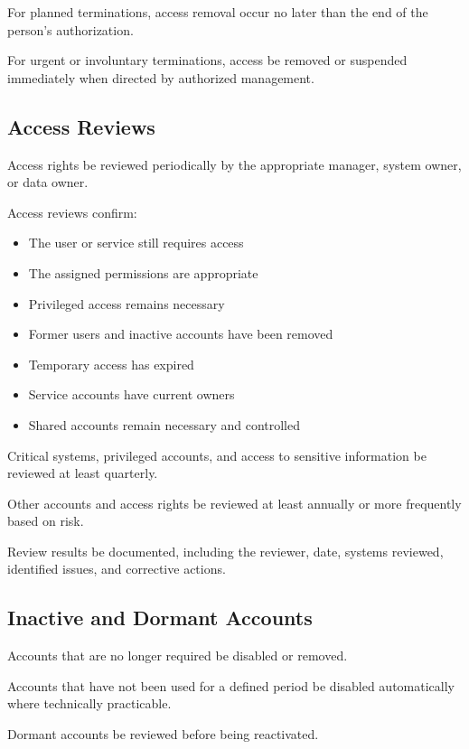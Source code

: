 For planned terminations, access removal \must{} occur no later than the end of the person's authorization.

For urgent or involuntary terminations, access \must{} be removed or suspended immediately when directed by authorized management.

\subsection{Access Reviews}

Access rights \must{} be reviewed periodically by the appropriate manager, system owner, or data owner.

Access reviews \should{} confirm:
\begin{itemize}
    \item The user or service still requires access
    \item The assigned permissions are appropriate
    \item Privileged access remains necessary
    \item Former users and inactive accounts have been removed
    \item Temporary access has expired
    \item Service accounts have current owners
    \item Shared accounts remain necessary and controlled
\end{itemize}

Critical systems, privileged accounts, and access to sensitive information \should{} be reviewed at least quarterly.

Other accounts and access rights \should{} be reviewed at least annually or more frequently based on risk.

Review results \must{} be documented, including the reviewer, date, systems reviewed, identified issues, and corrective actions.

\subsection{Inactive and Dormant Accounts}

Accounts that are no longer required \must{} be disabled or removed.

Accounts that have not been used for a defined period \should{} be disabled automatically where technically practicable.

Dormant accounts \must{} be reviewed before being reactivated.

